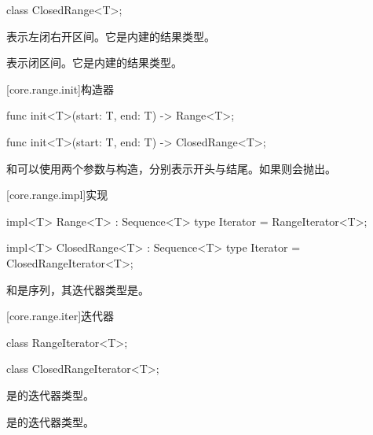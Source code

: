 \begin{itemdecl}
class ClosedRange<T>;
\end{itemdecl}

\pnum
{}表示左闭右开区间。它是内建的结果类型。

\pnum
{}表示闭区间。它是内建的结果类型。

[core.range.init]{构造器}

\begin{itemdecl}
func init<T>(start: T, end: T) -> Range<T>;
\end{itemdecl}

\begin{itemdecl}
func init<T>(start: T, end: T) -> ClosedRange<T>;
\end{itemdecl}

\pnum
{}和可以使用两个参数与构造，分别表示开头与结尾。如果则会抛出。

[core.range.impl]{实现}

\begin{itemdecl}
impl<T> Range<T> : Sequence<T> {
    type Iterator = RangeIterator<T>;
}
\end{itemdecl}

\begin{itemdecl}
impl<T> ClosedRange<T> : Sequence<T> {
    type Iterator = ClosedRangeIterator<T>;
}
\end{itemdecl}

\pnum
{}和是序列，其迭代器类型是。

[core.range.iter]{迭代器}

\begin{itemdecl}
class RangeIterator<T>;
\end{itemdecl}

\begin{itemdecl}
class ClosedRangeIterator<T>;
\end{itemdecl}

\pnum
{}是的迭代器类型。

\pnum
{}是的迭代器类型。

